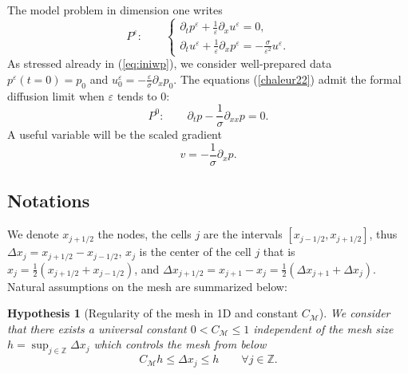 \documentclass[a4paper,french,english,10pt]{article}
\newcommand\eps{\varepsilon}
\newcommand{\dx}{\partial_x}
\newcommand{\dt}{\partial_t}
\newtheorem{hyp}[theorem]{Hypothesis}
\begin{document}
The model problem in dimension one writes
\begin{equation}\label{chaleur22}
P^\varepsilon: \qquad
 \left \{
\begin{array}{lll}
\partial_t p^{\eps} + \frac{1}{\eps}\partial_x u^{\eps} =0, \\
\partial_t u^{\eps} + \frac{1}{\eps}\partial_x p^{\eps} =
-\frac{\sigma}{\eps^2}u^{\eps}.
\end{array}
\right.
\end{equation}
As stressed already in (\ref{eq:iniwp}), we consider well-prepared data
$
p^\varepsilon(t=0)=p_0 $  and  $u_0^\varepsilon=-\frac\varepsilon \sigma \partial_{x}p_0$.
The equations (\ref{chaleur22}) 
admit the formal diffusion limit when $\eps$ tends to $0$:
\begin{equation}\label{difffff}
P^0: \qquad 
\dt p -\frac{1}{\sigma}\partial_{xx}p=0.
\end{equation}
A useful variable will be  the scaled gradient  
\begin{equation} \label{eq:diff-v}
v=-\frac{1}{\sigma}\dx p.
\end{equation}

\subsection{Notations}
We denote $x_{j+1/2}$ the nodes, the cells $j$ are the intervals $[x_{j-1/2},x_{j+1/2}]$, thus $\Delta x_j=x_{j+1/2}-x_{j-1/2}$, $x_j$ is the center of the cell $j$ that is $x_j =\frac12(x_{j+1/2}+x_{j-1/2})$, and $\Delta x_{j+1/2}=x_{j+1}-x_j=\frac12(\Delta x_{j+1}+\Delta x_{j})$. Natural assumptions on the mesh are summarized below:

\begin{hyp}[Regularity of the mesh in 1D and constant $C_\mathcal M$] \label{geometrie1d}
 We consider that there exists 
a universal constant $0<C_{\mathcal{M}}\leq 1$ independent of the mesh size
$h=\sup_{j\in \mathbb Z} \Delta x_j $
which  controls the mesh from below
\begin{equation}\label{constante_mesh_1D}
C_{\mathcal{M}} h \leq \Delta x_j \leq h \qquad \forall j \in \mathbb{Z}.
\end{equation}
\end{hyp}
\end{document}

